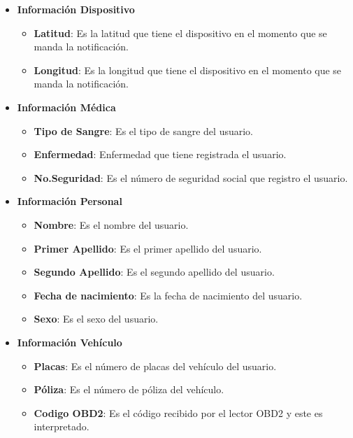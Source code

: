 \begin{itemize}
	\item \textbf{Información Dispositivo}
	\begin{itemize}
		\item \textbf{Latitud}: Es la latitud que tiene el dispositivo en el momento que se manda la notificación.
		\item \textbf{Longitud}: Es la longitud que tiene el dispositivo en el momento que se manda la notificación.
	\end{itemize}
	
	\item \textbf{Información Médica}
	
	\begin{itemize}
		\item \textbf{Tipo de Sangre}: Es el tipo de sangre del usuario.
		\item \textbf{Enfermedad}: Enfermedad que tiene registrada el usuario.
		\item \textbf{No.Seguridad}: Es el número de seguridad social que registro el usuario.
	\end{itemize}
	
	\item \textbf{Información Personal}
	
	\begin{itemize}
		\item \textbf{Nombre}: Es el nombre del usuario.
		\item \textbf{Primer Apellido}: Es el primer apellido del usuario.
		\item \textbf{Segundo Apellido}: Es el segundo apellido del usuario.
		\item \textbf{Fecha de nacimiento}: Es la fecha de nacimiento del usuario.
		\item \textbf{Sexo}: Es el sexo del usuario.
	\end{itemize}
	
	\item \textbf{Información Vehículo}
	
	\begin{itemize}
		\item \textbf{Placas}: Es el número de placas del vehículo del usuario.
		\item \textbf{Póliza}: Es el número de póliza del vehículo.
		\item \textbf{Codigo OBD2}: Es el código recibido por el lector OBD2 y este es interpretado.
	\end{itemize}
	
\end{itemize}

